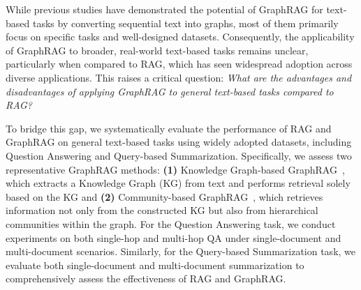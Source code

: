 While previous studies have demonstrated the potential of GraphRAG for text-based tasks by converting sequential text into graphs, most of them primarily focus on specific tasks and well-designed datasets. Consequently, the applicability of GraphRAG to broader, real-world text-based tasks remains unclear, particularly when compared to RAG, which has seen widespread adoption across diverse applications. This raises a critical question: {\it What are the advantages and disadvantages of applying GraphRAG to general text-based tasks compared to RAG?}

To bridge this gap, we systematically evaluate the performance of RAG and GraphRAG on general text-based tasks using widely adopted datasets, including Question Answering and Query-based Summarization. Specifically, we assess two representative GraphRAG methods: {\bf (1)} Knowledge Graph-based GraphRAG~\cite{Liu_LlamaIndex_2022}, which extracts a Knowledge Graph (KG) from text and performs retrieval solely based on the KG and {\bf (2)} Community-based GraphRAG~\citep{edge2024local}, which retrieves information not only from the constructed KG but also from hierarchical communities within the graph. For the Question Answering task, we conduct experiments on both single-hop and multi-hop QA under single-document and multi-document scenarios. Similarly, for the Query-based Summarization task, we evaluate both single-document and multi-document summarization to comprehensively assess the effectiveness of RAG and GraphRAG.

